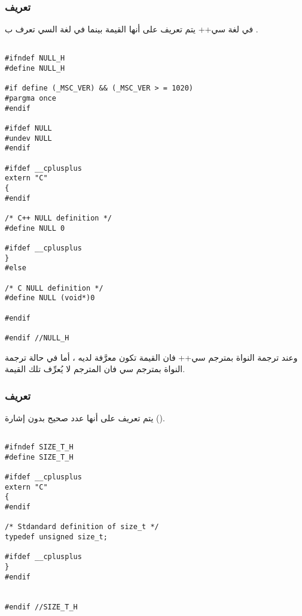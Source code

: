 \documentclass[document.tex]{subfiles}
\begin{document}
\subsubsection{تعريف }
في لغة سي++ يتم تعريف  على أنها القيمة  بينما في لغة السي تعرف ب .
\begin{english}

\lstset{numberstyle=\tiny,numbersep=5pt,tabsize=2,extendedchars=true,breaklines=true,frame=b,showspaces=false, showtabs=false,xleftmargin=10pt,framexleftmargin=10pt,framexrightmargin=5pt,framexbottommargin=4pt,showstringspaces=false,language=C++}

\begin{lstlisting}[label=null_def,caption=null.h:Definition of NULL in C and C++]

#ifndef NULL_H
#define NULL_H

#if define (_MSC_VER) && (_MSC_VER > = 1020)
#pargma once
#endif

#ifdef NULL
#undev NULL
#endif

#ifdef __cplusplus
extern "C"
{
#endif

/* C++ NULL definition */
#define NULL 0

#ifdef __cplusplus
}
#else

/* C NULL definition */
#define NULL (void*)0

#endif

#endif //NULL_H
\end{lstlisting}
\end{english}

وعند ترجمة النواة بمترجم سي++ فان القيمة  تكون معرَّفة لديه ، أما في حالة ترجمة النواة بمترجم سي فان المترجم لا يُعرِّف تلك القيمة.

\subsubsection{تعريف }
يتم تعريف  على أنها عدد صحيح  بدون إشارة ().

\begin{english}

\lstset{numberstyle=\tiny,numbersep=5pt,tabsize=2,extendedchars=true,breaklines=true,frame=b,showspaces=false, showtabs=false,xleftmargin=10pt,framexleftmargin=10pt,framexrightmargin=5pt,framexbottommargin=4pt,showstringspaces=false,language=C++}

\begin{lstlisting}[label=sizet_def,caption=size\_t.h:Definition of size\_t in C/C++]

#ifndef SIZE_T_H
#define SIZE_T_H

#ifdef __cplusplus
extern "C"
{
#endif

/* Stdandard definition of size_t */
typedef unsigned size_t;

#ifdef __cplusplus
}
#endif


#endif //SIZE_T_H

\end{lstlisting}
\end{english}
\end{document}
